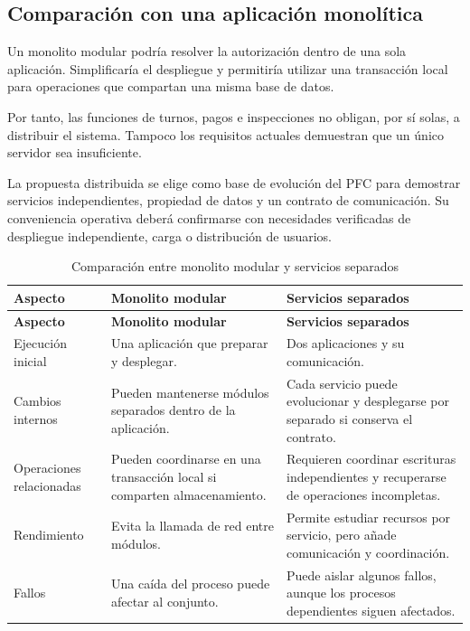 \documentclass[11pt,a4paper]{article}
\begin{document}
	\subsection{Comparación con una aplicación monolítica}
	
	Un monolito modular podría resolver la autorización dentro de una sola aplicación. Simplificaría el despliegue y permitiría utilizar una transacción local para operaciones que compartan una misma base de datos.
	
	Por tanto, las funciones de turnos, pagos e inspecciones no obligan, por sí solas, a distribuir el sistema. Tampoco los requisitos actuales demuestran que un único servidor sea insuficiente.
	
	La propuesta distribuida se elige como base de evolución del PFC para demostrar servicios independientes, propiedad de datos y un contrato de comunicación. Su conveniencia operativa deberá confirmarse con necesidades verificadas de despliegue independiente, carga o distribución de usuarios.
	
	\begin{xltabular}{\textwidth}{L{3.2cm}XX}
		\caption{Comparación entre monolito modular y servicios separados}\label{tab:monolito}\\
		\toprule
		\textbf{Aspecto} & \textbf{Monolito modular} & \textbf{Servicios separados} \\
		\midrule
		\endfirsthead
		\toprule
		\textbf{Aspecto} & \textbf{Monolito modular} & \textbf{Servicios separados} \\
		\midrule
		\endhead
		\bottomrule
		\endfoot
		Ejecución inicial & Una aplicación que preparar y desplegar. & Dos aplicaciones y su comunicación. \\
		Cambios internos & Pueden mantenerse módulos separados dentro de la aplicación. & Cada servicio puede evolucionar y desplegarse por separado si conserva el contrato. \\
		Operaciones relacionadas & Pueden coordinarse en una transacción local si comparten almacenamiento. & Requieren coordinar escrituras independientes y recuperarse de operaciones incompletas. \\
		Rendimiento & Evita la llamada de red entre módulos. & Permite estudiar recursos por servicio, pero añade comunicación y coordinación. \\
		Fallos & Una caída del proceso puede afectar al conjunto. & Puede aislar algunos fallos, aunque los procesos dependientes siguen afectados. \\
	\end{xltabular}
	
\end{document}
